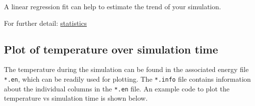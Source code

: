 \documentclass[
  letterpaper,
]{article}
\begin{document}
A linear regression fit can help to estimate the trend of your
simulation.

For further detail:
\protect\hyperlink{statistical-excursion}{statistics}

\hypertarget{plot-of-temperature-over-simulation-time}{%
\subsection{Plot of temperature over simulation
time}\label{plot-of-temperature-over-simulation-time}}

The temperature during the simulation can be found in the associated
energy file \texttt{*.en}, which can be readily used for plotting. The
\texttt{*.info} file contains information about the individual columns
in the \texttt{*.en} file. An example code to plot the temperature vs
simulation time is shown below.
\end{document}
